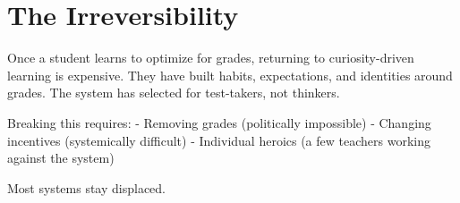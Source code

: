 \documentclass[12pt]{article}
\begin{document}
\section{The Irreversibility}

Once a student learns to optimize for grades, returning to curiosity-driven learning is expensive. They have built habits, expectations, and identities around grades. The system has selected for test-takers, not thinkers.

Breaking this requires:
- Removing grades (politically impossible)
- Changing incentives (systemically difficult)
- Individual heroics (a few teachers working against the system)

Most systems stay displaced.
\end{document}
